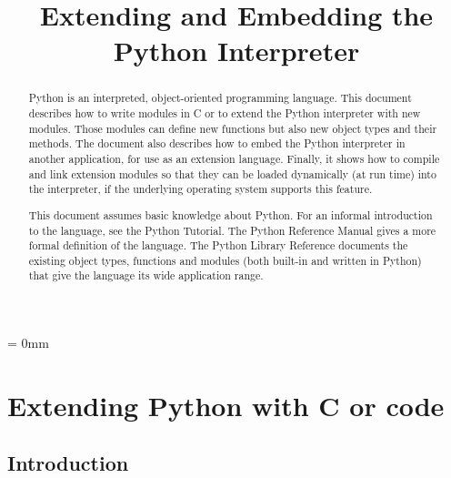 

\title{Extending and Embedding the Python Interpreter}



\makeindex




\maketitle



\begin{abstract}

\noindent
Python is an interpreted, object-oriented programming language.  This
document describes how to write modules in C or \Cpp{} to extend the
Python interpreter with new modules.  Those modules can define new
functions but also new object types and their methods.  The document
also describes how to embed the Python interpreter in another
application, for use as an extension language.  Finally, it shows how
to compile and link extension modules so that they can be loaded
dynamically (at run time) into the interpreter, if the underlying
operating system supports this feature.

This document assumes basic knowledge about Python.  For an informal
introduction to the language, see the Python Tutorial.  The Python
Reference Manual gives a more formal definition of the language.  The
Python Library Reference documents the existing object types,
functions and modules (both built-in and written in Python) that give
the language its wide application range.

\end{abstract}

\pagebreak

{
\parskip = 0mm
\tableofcontents
}

\pagebreak



\chapter{Extending Python with C or \Cpp{} code}


\section{Introduction}

